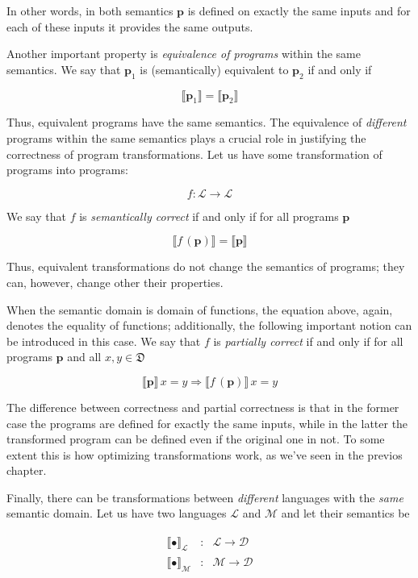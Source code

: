 \documentclass{book}
\newcommand{\sembr}[1]{\llbracket{#1}\rrbracket}
\newcommand{\primi}[1]{\mathbf{#1}}
\newcommand{\ph}{{\phantom{x}}}
\begin{document}
In other words, in both semantics $\primi{p}$ is defined on exactly the same inputs and for each of these inputs it provides the same outputs.

Another important property is \emph{equivalence of programs} within the same semantics. We say that $\primi{p}_1$ is (semantically) equivalent to $\primi{p}_2$ if
and only if

\[
\sembr{\primi{p}_1}=\sembr{\primi{p}_2}
\]

Thus, equivalent programs have the same semantics. The equivalence of \emph{different} programs within the same semantics plays a crucial
role in justifying the correctness of program transformations. Let us have some transformation of programs into programs:

\[
f : \mathcal{L}\to\mathcal{L}
\]

We say that $f$ is \emph{semantically correct} if and only if for all programs $\primi{p}$

\[
\sembr{f\,(\primi{p})}=\sembr{\primi{p}}
\]

Thus, equivalent transformations do not change the semantics of programs; they can, however, change other their properties.

When the semantic domain is domain of functions, the equation above, again, denotes the equality of functions; additionally,
the following important notion can be introduced in this case. We say that $f$ is \emph{partially correct} if and only if
for all programs $\primi{p}$ and all $x, y\in\mathfrak{D}$

\[
\sembr{\primi{p}}\,x=y\Rightarrow\sembr{f\,(\primi{p})}\,x=y
\]

The difference between correctness and partial correctness is that in the former case the programs are defined for exactly the same inputs,
while in the latter the transformed program can be defined even if the original one in not. To some extent this is how
optimizing transformations work, as we've seen in the previos chapter.

Finally, there can be transformations between \emph{different} languages with the \emph{same} semantic domain. Let us have two languages $\mathcal{L}$ and $\mathcal{M}$
and let their semantics be

\[
\begin{array}{rcl}
  \sembr{\bullet}^\ph_\mathcal{L} & : & \mathcal{L}\to\mathcal{D}\\
  \sembr{\bullet}^\ph_\mathcal{M} & : & \mathcal{M}\to\mathcal{D}
\end{array}
\]
\end{document}
